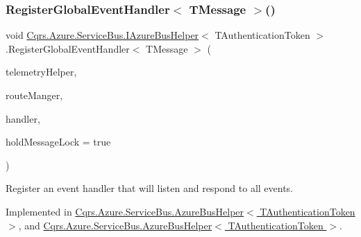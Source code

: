 \mbox{\label{interfaceCqrs_1_1Azure_1_1ServiceBus_1_1IAzureBusHelper_aef39e7d297ccaa36b02ccc3012dc5906_aef39e7d297ccaa36b02ccc3012dc5906}} 
\subsubsection{\texorpdfstring{Register\+Global\+Event\+Handler$<$ T\+Message $>$()}{RegisterGlobalEventHandler< TMessage >()}}
{\footnotesize\ttfamily void \hyperlink{interfaceCqrs_1_1Azure_1_1ServiceBus_1_1IAzureBusHelper}{Cqrs.\+Azure.\+Service\+Bus.\+I\+Azure\+Bus\+Helper}$<$ T\+Authentication\+Token $>$.Register\+Global\+Event\+Handler$<$ T\+Message $>$ (\begin{DoxyParamCaption}\item[{I\+Telemetry\+Helper}]{telemetry\+Helper,  }\item[{\hyperlink{classCqrs_1_1Bus_1_1RouteManager}{Route\+Manager}}]{route\+Manger,  }\item[{Action$<$ T\+Message $>$}]{handler,  }\item[{bool}]{hold\+Message\+Lock = {\ttfamily true} }\end{DoxyParamCaption})}



Register an event handler that will listen and respond to all events. 



Implemented in \hyperlink{classCqrs_1_1Azure_1_1ServiceBus_1_1AzureBusHelper_af2835c64fbc1d3aaadb5f1a02705f125_af2835c64fbc1d3aaadb5f1a02705f125}{Cqrs.\+Azure.\+Service\+Bus.\+Azure\+Bus\+Helper$<$ T\+Authentication\+Token $>$}, and \hyperlink{classCqrs_1_1Azure_1_1ServiceBus_1_1AzureBusHelper_af2835c64fbc1d3aaadb5f1a02705f125_af2835c64fbc1d3aaadb5f1a02705f125}{Cqrs.\+Azure.\+Service\+Bus.\+Azure\+Bus\+Helper$<$ T\+Authentication\+Token $>$}.


